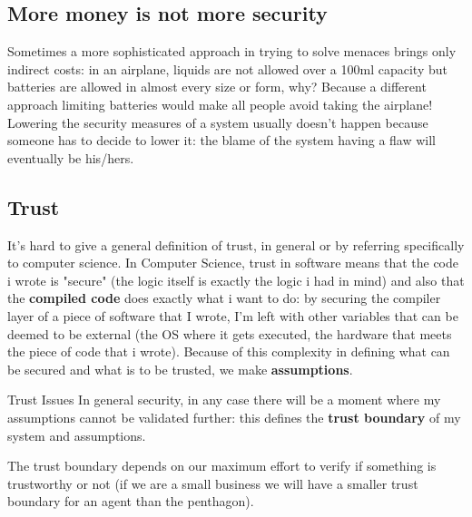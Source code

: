 \subsection{More money is not more security}
Sometimes a more sophisticated approach in trying to solve menaces brings
only indirect costs: in an airplane, liquids are not allowed over a 100ml 
capacity but batteries are allowed in almost every size or form, why? Because
a different approach limiting batteries would make all people avoid taking the
airplane! \newline
Lowering the security measures of a system usually doesn't happen because
someone has to decide to lower it: the blame of the system having a flaw will
eventually be his/hers.

\subsection{Trust}
It's hard to give a general definition of trust, in general or by referring
specifically to computer science.
In Computer Science, trust in software means that the code i wrote is "secure" 
(the logic itself is exactly the logic i had in mind) and also that the 
\textbf{compiled code} does exactly what i want to do: by securing the 
compiler layer of a piece of software that I wrote, I'm left with other 
variables that can be deemed to be external (the OS where it gets executed, 
the hardware that meets the piece of code that i wrote). Because of this 
complexity in defining what can be secured and what is to be trusted, 
we make \textbf{assumptions}.
\begin{key}{Trust Issues}
    In general security, in any case there will be a moment where my 
    assumptions cannot be validated further: this defines the 
    \textbf{trust boundary} of my system and assumptions.
\end{key}
The trust boundary depends on our maximum effort to verify if something is 
trustworthy or not (if we are a small business we will have a smaller trust 
boundary for an agent than the penthagon).